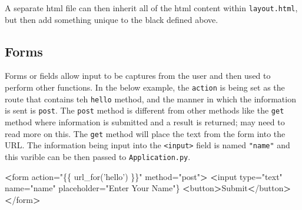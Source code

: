 \documentclass[]{book}
\newenvironment{Shaded}{\begin{snugshade}}{\end{snugshade}}
\newcommand{\StringTok}[1]{\textcolor[rgb]{0.31,0.60,0.02}{#1}}
\newcommand{\OperatorTok}[1]{\textcolor[rgb]{0.81,0.36,0.00}{\textbf{#1}}}
\newcommand{\ExtensionTok}[1]{#1}
\newcommand{\NormalTok}[1]{#1}
\begin{document}
\begin{Shaded}
\end{Shaded}

A separate html file can then inherit all of the html content within
\texttt{layout.html}, but then add something unique to the black defined
above.

\begin{Shaded}
\end{Shaded}

\subsection{Forms}\label{forms-1}

Forms or fields allow input to be captures from the user and then used
to perform other functions. In the below example, the \texttt{action} is
being set as the route that contains teh \texttt{hello} method, and the
manner in which the information is sent is \texttt{post}. The
\texttt{post} method is different from other methods like the
\texttt{get} method where information is submitted and a result is
returned; may need to read more on this. The \texttt{get} method will
place the text from the form into the URL. The information being input
into the \texttt{\textless{}input\textgreater{}} field is named
\texttt{"name"} and this varible can be then passed to
\texttt{Application.py}.

\begin{Shaded}
\begin{Highlighting}[]
\OperatorTok{<}\ExtensionTok{form}\NormalTok{ action=}\StringTok{"\{\{ url_for('hello') \}\}"}\NormalTok{ method=}\StringTok{"post"}\OperatorTok{>}
    \OperatorTok{<}\ExtensionTok{input}\NormalTok{ type=}\StringTok{"text"}\NormalTok{ name=}\StringTok{"name"}\NormalTok{ placeholder=}\StringTok{"Enter Your Name"}\NormalTok{\}}
    \OperatorTok{<}\ExtensionTok{button}\OperatorTok{>}\NormalTok{Submit}\OperatorTok{<}\NormalTok{/button}\OperatorTok{>}
\OperatorTok{<}\NormalTok{/}\ExtensionTok{form}\OperatorTok{>}
\end{Highlighting}
\end{Shaded}
\end{document}
